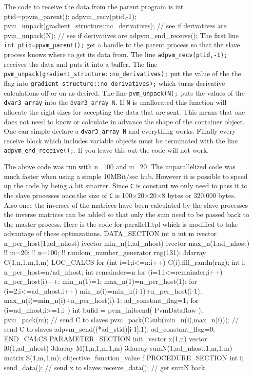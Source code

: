 \endexample

The code to receive the data from the parent program is
\beginexample
     int ptid=ppvm_parent();
     adpvm_recv(ptid,-1);
     pvm_unpack(gradient_structure::no_derivatives);  // see if derivatives are
     pvm_unpack(N);  // see if derivatives are
     adpvm_end_receive();
\endexample
The first line {\tt int ptid=ppvm\_parent();} get a handle to the parent process
so that the slave process knows where to get its data from. The line
     { \tt adpvm\_recv(ptid,-1);} receives the data and puts it into a buffer.
The line
    {\tt  pvm\_unpack(gradient\_structure::no\_derivatives);} put the value of the 
the flag into {\tt  gradient\_structure::no\_derivatives);} which turns
derivative calculations off or on as desired. 
The line {\tt  pvm\_unpack(N);}
puts the values of the {\tt dvar3\_array} into the {\tt dvar3\_array N}.
If {\tt N} is unallocated this function will allocate the right sizes for 
accepting the data that are sent. This means that one does not need to
know or calculate in advance the shape of the container object. One can simple
declare a {\tt dvar3\_array N} and everything works.
Finally every receive block which includes variable objects must be
terminated with the line {\tt adpvm\_end\_receive();}. If you leave this out
the code will not work.

The above code was run with n=100 and m=20. The unparallelized code
was much faster when using a simple 10MBit/sec hub. However it
is possible to speed up the code by being a bit smarter.
Since {\tt C} is constant we only need to pass it to the
slave processes once.the size of {\tt C} is 100$\times$20$\times$20$\times$8 bytes
or 320,000 bytes. Also once the inverses of the matrices have been calculated
by the slave  processes the inverse matrices can be added so that only
the sum need to be passed back to the master process.
Here is the code for parallel1.tpl which is modified to take advantage
of these optimzations. 
\beginexample
DATA_SECTION
  int n
  int m
  ivector n_per_host(1,ad_nhost)
  ivector min_n(1,ad_nhost)
  ivector max_n(1,ad_nhost)
 !! m=20;
 !! n=100;
 !! random_number_generator rng(131);
  3darray C(1,n,1,m,1,m)
 LOC_CALCS
  for (int i=1;i<=n;i++) C(i).fill_randn(rng);
  int i;
  n_per_host=n/ad_nhost;
  int remainder=n%
  for (i=1;i<=remainder;i++) n_per_host(i)++;
  min_n(1)=1;
  max_n(1)=n_per_host(1);
  for (i=2;i<=ad_nhost;i++) 
  {
    min_n(i)=min_n(i-1)+n_per_host(i-1);
    max_n(i)=min_n(i)+n_per_host(i)-1;
  }
  ad_constant_flag=1;
  for (i=ad_nhost;i>=1;i--) 
  {
    int bufid = pvm_initsend( PvmDataRaw );
    pvm_pack(m); // send C to slaves
    pvm_pack(C.sub(min_n(i),max_n(i))); // send C to slaves
    adpvm_send((*ad_stid)[i-1],1);
  }
  ad_constant_flag=0;
 END_CALCS
PARAMETER_SECTION
  init_vector x(1,n)
  vector f0(1,ad_nhost)
  3darray M(1,n,1,m,1,m)
  3darray sumN(1,ad_nhost,1,m,1,m)
  matrix S(1,m,1,m);
  objective_function_value f
PROCEDURE_SECTION
   int i;
   send_data(); // send x to slaves
   receive_data(); // get sumN back
   
